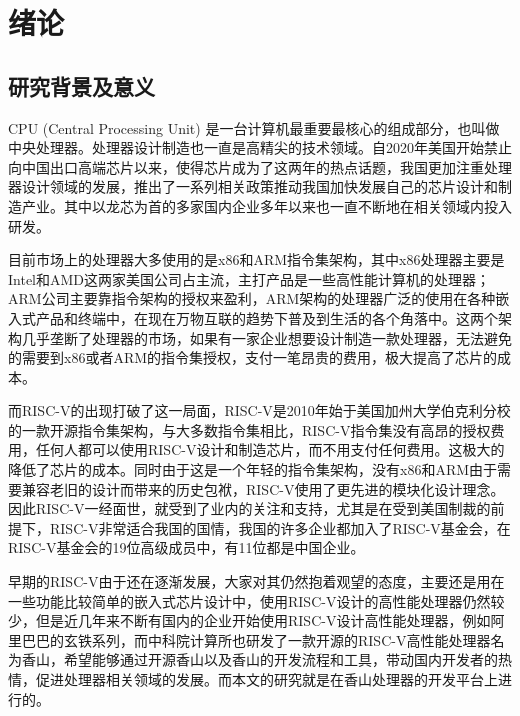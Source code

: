 
\chapter{绪论}

\section{研究背景及意义}
CPU (Central Processing Unit) 是一台计算机最重要最核心的组成部分，也叫做中央处理器。处理器设计制造也一直是高精尖的技术领域。自2020年美国开始禁止向中国出口高端芯片以来，使得芯片成为了这两年的热点话题，我国更加注重处理器设计领域的发展，推出了一系列相关政策推动我国加快发展自己的芯片设计和制造产业。其中以龙芯为首的多家国内企业多年以来也一直不断地在相关领域内投入研发。

目前市场上的处理器大多使用的是x86和ARM指令集架构，其中x86处理器主要是Intel和AMD这两家美国公司占主流，主打产品是一些高性能计算机的处理器；ARM公司主要靠指令架构的授权来盈利，ARM架构的处理器广泛的使用在各种嵌入式产品和终端中，在现在万物互联的趋势下普及到生活的各个角落中。这两个架构几乎垄断了处理器的市场，如果有一家企业想要设计制造一款处理器，无法避免的需要到x86或者ARM的指令集授权，支付一笔昂贵的费用，极大提高了芯片的成本。

而RISC-V的出现打破了这一局面，RISC-V是2010年始于美国加州大学伯克利分校的一款开源指令集架构，与大多数指令集相比，RISC-V指令集没有高昂的授权费用，任何人都可以使用RISC-V设计和制造芯片，而不用支付任何费用。这极大的降低了芯片的成本。同时由于这是一个年轻的指令集架构，没有x86和ARM由于需要兼容老旧的设计而带来的历史包袱，RISC-V使用了更先进的模块化设计理念。因此RISC-V一经面世，就受到了业内的关注和支持，尤其是在受到美国制裁的前提下，RISC-V非常适合我国的国情，我国的许多企业都加入了RISC-V基金会，在RISC-V基金会的19位高级成员中，有11位都是中国企业。


早期的RISC-V由于还在逐渐发展，大家对其仍然抱着观望的态度，主要还是用在一些功能比较简单的嵌入式芯片设计中，使用RISC-V设计的高性能处理器仍然较少，但是近几年来不断有国内的企业开始使用RISC-V设计高性能处理器，例如阿里巴巴的玄铁系列，而中科院计算所也研发了一款开源的RISC-V高性能处理器名为香山\cite{xiangshan}，希望能够通过开源香山以及香山的开发流程和工具，带动国内开发者的热情，促进处理器相关领域的发展。而本文的研究就是在香山处理器的开发平台上进行的。


